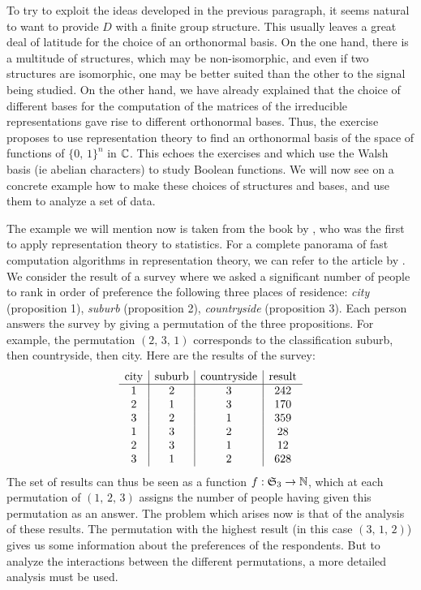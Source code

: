  
To try to exploit the ideas developed in the previous paragraph, it seems natural to want to provide $ D $ with a finite group structure. This usually leaves a great deal of latitude for the choice of an orthonormal basis. On the one hand, there is a multitude of structures, which may be non-isomorphic, and even if two structures are isomorphic, one may be better suited than the other to the signal being studied. On the other hand, we have already explained that the choice of different bases for the computation of the matrices of the irreducible representations gave rise to different orthonormal bases. Thus, the exercise  proposes to use representation theory to find an orthonormal basis of the space of functions of $ \{0, \, 1\}^n $ in $ \mathbb{C} $. This echoes the exercises  and  which use the Walsh basis (ie abelian characters) to study Boolean functions. We will now see on a concrete example how to make these choices of structures and bases, and use them to analyze a set of data.
 
 
The example we will mention now is taken from the book by  \cite{diaconis-representations-statistics}, who was the first to apply representation theory to statistics. For a complete panorama of fast computation algorithms in representation theory, we can refer to the article by  \cite{rockmore-generalized}. We consider the result of a survey where we asked a significant number of people to rank in order of preference the following three places of residence: \textit{city} (proposition 1), \textit{suburb} (proposition 2), \textit{countryside} (proposition 3). Each person answers the survey by giving a permutation of the three propositions. For example, the permutation $ (2, \, 3, \, 1) $ corresponds to the classification suburb, then countryside, then city. Here are the results of the survey:
\begin{equation*}
\begin{array}{c | c | c | c} \text{city} & \text{suburb} & \text{countryside} & \text{result} \\\hline 1 & 2 & 3 & 242 \\2 & 1 & 3 & 170 \\3 & 2 & 1 & 359 \\1 & 3 & 2 & 28 \\2 & 3 & 1 & 12 \\3 & 1 & 2 & 628 \end{array}
\end{equation*}
The set of results can thus be seen as a function $ f: \mathfrak{S}_3 \rightarrow \mathbb{N} $, which at each permutation of $ (1, \, 2, \, 3) $ assigns the number of people having given this permutation as an answer. The problem which arises now is that of the analysis of these results. The permutation with the highest result (in this case $ (3, \, 1, \, 2) $) gives us some information about the preferences of the respondents. But to analyze the interactions between the different permutations, a more detailed analysis must be used.
 
